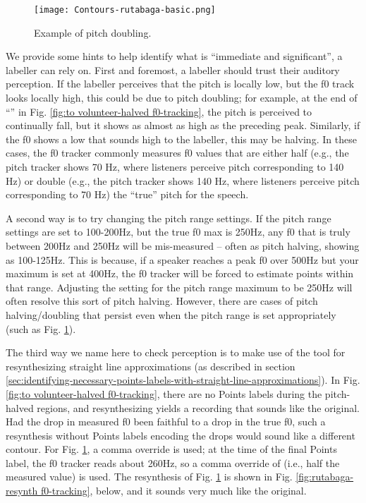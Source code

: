 \begin{figure}[H]
\centering
%
\texttt{[image: Contours-rutabaga-basic.png]}
%
\caption{Example of pitch doubling.%
\label{fig:rutabaga f0-tracking}%
%
}
\end{figure}

We provide some hints to help identify what is “immediate and significant”, a labeller can rely on.
First and foremost, a labeller should trust their auditory perception. If the labeller perceives that the pitch is locally low, but the f0 track looks locally high, this could be due to pitch doubling; for example, at the end of “” in Fig. \ref{fig:to volunteer-halved f0-tracking}, the pitch is perceived to continually fall, but it shows as almost as high as the preceding peak. Similarly, if the f0 shows a low that sounds high to the labeller, this may be halving. In these cases, the f0 tracker commonly measures f0 values that are either half (e.g., the pitch tracker shows 70 Hz, where listeners perceive pitch corresponding to 140 Hz) or double (e.g., the pitch tracker shows 140 Hz, where listeners perceive pitch corresponding to 70 Hz) the “true” pitch for the speech.

A second way is to try changing the pitch range settings. If the pitch range settings are set to 100-200Hz, but the true f0 max is 250Hz, any f0 that is truly between 200Hz and 250Hz will be mis-measured – often as pitch halving, showing as 100-125Hz. This is because, if a speaker reaches a peak f0 over 500Hz but your maximum is set at 400Hz, the f0 tracker will be forced to estimate points within that range. Adjusting the setting for the pitch range maximum to be 250Hz will often resolve this sort of pitch halving. However, there are cases of pitch halving\slash doubling that persist even when the pitch range is set appropriately (such as Fig. \ref{fig:rutabaga f0-tracking}).

The third way we name here to check perception is to make use of the tool for resynthesizing straight line approximations (as described in section \ref{sec:identifying-necessary-points-labels-with-straight-line-approximations}). In Fig. \ref{fig:to volunteer-halved f0-tracking}, there are no Points labels during the pitch-halved regions, and resynthesizing yields a recording that sounds like the original. Had the drop in measured f0 been faithful to a drop in the true f0, such a resynthesis without Points labels encoding the drops would sound like a different contour. For Fig. \ref{fig:rutabaga f0-tracking}, a comma override is used; at the time of the final Points label, the f0 tracker reads about 260Hz, so a comma override of  (i.e., half the measured value) is used. The resynthesis of Fig. \ref{fig:rutabaga f0-tracking} is shown in Fig. \ref{fig:rutabaga-resynth f0-tracking}, below, and it sounds very much like the original.

